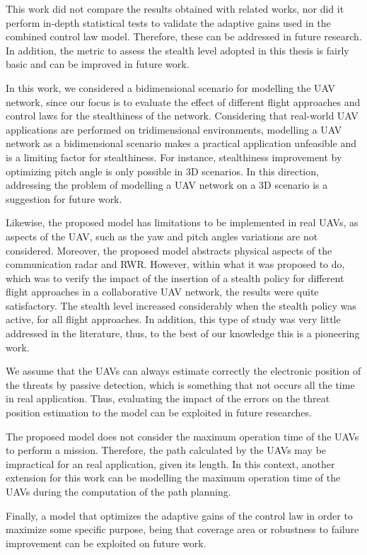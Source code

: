 This work did not compare the results obtained with related works, nor did it perform in-depth statistical tests to validate the adaptive gains used in the combined control law model. Therefore, these can be addressed in future research. In addition, the metric to assess the stealth level adopted in this thesis is fairly basic and can be improved in future work.

In this work, we considered a bidimensional scenario for modelling the UAV network, since our focus is to evaluate the effect of different flight approaches and control laws for the stealthiness of the network. Considering that real-world UAV applications are performed on tridimensional environments, modelling a UAV network as a bidimensional scenario makes a practical application unfeasible and is a limiting factor for stealthiness. For instance, stealthiness improvement by optimizing pitch angle is only possible in 3D scenarios. In this direction, addressing the problem of modelling a UAV network on a 3D scenario is a suggestion for future work.

Likewise, the proposed model has limitations to be implemented in real UAVs, as aspects of the UAV, such as the yaw and pitch angles variations are not considered. Moreover, the proposed model abstracts physical aspects of the communication radar and RWR. However, within what it was proposed to do, which was to verify the impact of the insertion of a stealth policy for different flight approaches in a collaborative UAV network, the results were quite satisfactory. The stealth level increased considerably when the stealth policy was active, for all flight approaches. In addition, this type of study was very little addressed in the literature, thus, to the best of our knowledge this is a pioneering work.

We assume that the UAVs can always estimate correctly the electronic position of the threats by passive detection, which is something that not occurs all the time in real application. Thus, evaluating the impact of the errors on the threat position estimation to the model can be exploited in future researches.

The proposed model does not consider the maximum operation time of the UAVs to perform a mission. Therefore, the path calculated by the UAVs may be impractical for an real application, given its length. In this context, another extension for this work can be modelling the maximum operation time of the UAVs during the computation of the path planning.

Finally, a model that optimizes the adaptive gains of the control law in order to maximize some specific purpose, being that coverage area or robustness to failure improvement can be exploited on future work.


